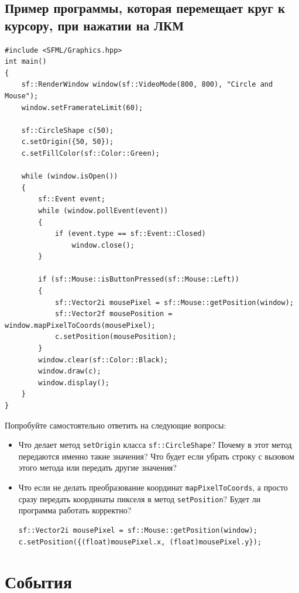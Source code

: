 \documentclass{article}
\begin{document}
\subsection*{Пример программы, которая перемещает круг к курсору, при нажатии на ЛКМ}
\begin{lstlisting}
#include <SFML/Graphics.hpp>
int main()
{
    sf::RenderWindow window(sf::VideoMode(800, 800), "Circle and Mouse");
    window.setFramerateLimit(60);
    
    sf::CircleShape c(50);
    c.setOrigin({50, 50});
    c.setFillColor(sf::Color::Green);
    
    while (window.isOpen())
    {
        sf::Event event;
        while (window.pollEvent(event)) 
        {
            if (event.type == sf::Event::Closed)
                window.close();
        }
        
        if (sf::Mouse::isButtonPressed(sf::Mouse::Left))
        {
            sf::Vector2i mousePixel = sf::Mouse::getPosition(window);
            sf::Vector2f mousePosition = window.mapPixelToCoords(mousePixel);
            c.setPosition(mousePosition);
        }
        window.clear(sf::Color::Black);
        window.draw(c);
        window.display();
    }
}
\end{lstlisting}
Попробуйте самостоятельно ответить на следующие вопросы:
\begin{itemize}
\item Что делает метод \texttt{setOrigin} класса \texttt{sf::CircleShape}? Почему в этот метод передаются именно такие значения? Что будет если убрать строку с вызовом этого метода или передать другие значения?
\item Что если не делать преобразование координат \texttt{mapPixelToCoords}, а просто сразу передать координаты пикселя в метод \texttt{setPosition}? Будет ли программа работать корректно?
\begin{lstlisting}[frame=none]
sf::Vector2i mousePixel = sf::Mouse::getPosition(window);
c.setPosition({(float)mousePixel.x, (float)mousePixel.y});
\end{lstlisting}
\end{itemize}


\newpage




\newpage

\section{События}
\end{document}
